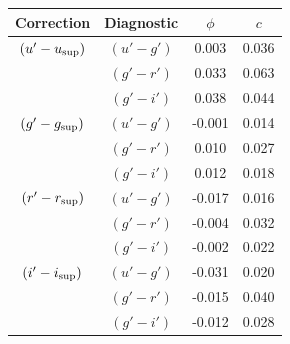 \noindent\begin{minipage}{\linewidth}
    \centering

    \label{table:observations:all ULTRACAM colour corrections}
    \begin{tabular}{cccc}
        Correction          & Diagnostic    & $\phi$    & $c$ \\
        \hline
        \hline
        $(u'-u_{\rm sup})$  &  $(u'-g')$    & 0.003     & 0.036 \\
                            &  $(g'-r')$    & 0.033     & 0.063 \\
                            &  $(g'-i')$    & 0.038     & 0.044 \\
        \hline
        $(g'-g_{\rm sup})$  &  $(u'-g')$    & -0.001    & 0.014 \\
                            &  $(g'-r')$    & 0.010     & 0.027 \\
                            &  $(g'-i')$    & 0.012     & 0.018 \\
        \hline
        $(r'-r_{\rm sup})$  &  $(u'-g')$    & -0.017    & 0.016 \\
                            &  $(g'-r')$    & -0.004    & 0.032 \\
                            &  $(g'-i')$    & -0.002    & 0.022 \\
        \hline
        $(i'-i_{\rm sup})$  &  $(u'-g')$    & -0.031    & 0.020 \\
                            &  $(g'-r')$    & -0.015    & 0.040 \\
                            &  $(g'-i')$    & -0.012    & 0.028 \\
        \hline
        \hline
    \end{tabular}


\end{minipage}
